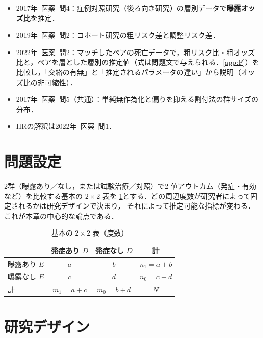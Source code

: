 \documentclass[a4paper,11pt,openany]{ltjsbook}
\newcommand{\kakomon}[2]{\mbox{#1年 医薬 問#2}}
\begin{document}
\begin{exambox}
\begin{itemize}
\item \kakomon{2017}{4}：症例対照研究（後ろ向き研究）の層別データで\textbf{曝露オッズ比}を推定．
\item \kakomon{2019}{2}：コホート研究の粗リスク差と調整リスク差．
\item \kakomon{2022}{2}：マッチしたペアの死亡データで，粗リスク比・粗オッズ比と，ペアを層とした層別の推定値（式は問題文で与えられる．\cref{app:F}）を比較し，「交絡の有無」と「推定されるパラメータの違い」から説明（オッズ比の非可縮性）．
\item \kakomon{2017}{5}（共通）：単純無作為化と偏りを抑える割付法の群サイズの分布．
\item HRの解釈は\kakomon{2022}{1}．
\end{itemize}
\end{exambox}

\section{問題設定}\label{sec:02-setting}
2群（曝露あり／なし，または試験治療／対照）で2 値アウトカム（発症・有効など）を比較する基本の $2\times2$ 表を
\cref{tab:02-2x2}とする．どの周辺度数が研究者によって固定されるかは研究デザインで決まり，
それによって推定可能な指標が変わる．これが本章の中心的な論点である．
\begin{table}[htbp]
\centering\small
\caption{基本の $2\times2$ 表（度数）}\label{tab:02-2x2}
\begin{tabular}{@{}lccc@{}}
\toprule
 & 発症あり $D$ & 発症なし $\bar D$ & 計\\
\midrule
曝露あり $E$ & $a$ & $b$ & $n_1=a+b$\\
曝露なし $\bar E$ & $c$ & $d$ & $n_0=c+d$\\
\midrule
計 & $m_1=a+c$ & $m_0=b+d$ & $N$\\
\bottomrule
\end{tabular}
\end{table}

\section{研究デザイン}\label{sec:02-design}
\end{document}
